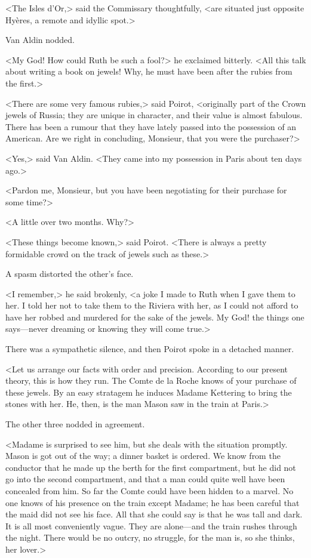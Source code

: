 <The Isles d'Or,> said the Commissary thoughtfully, <are situated just opposite Hyères, a remote and idyllic spot.>

Van Aldin nodded.

<My God! How could Ruth be such a fool?> he exclaimed bitterly. <All this talk about writing a book on jewels! Why, he must have been after the rubies from the first.>

<There are some very famous rubies,> said Poirot, <originally part of the Crown jewels of Russia; they are unique in character, and their value is almost fabulous. There has been a rumour that they have lately passed into the possession of an American. Are we right in concluding, Monsieur, that you were the purchaser?>

<Yes,> said Van Aldin. <They came into my possession in Paris about ten days ago.>

<Pardon me, Monsieur, but you have been negotiating for their purchase for some time?>

<A little over two months. Why?>

<These things become known,> said Poirot. <There is always a pretty formidable crowd on the track of jewels such as these.>

A spasm distorted the other's face.

<I remember,> he said brokenly, <a joke I made to Ruth when I gave them to her. I told her not to take them to the Riviera with her, as I could not afford to have her robbed and murdered for the sake of the jewels. My God! the things one says—never dreaming or knowing they will come true.>

There was a sympathetic silence, and then Poirot spoke in a detached manner.

<Let us arrange our facts with order and precision. According to our present theory, this is how they run. The Comte de la Roche knows of your purchase of these jewels. By an easy stratagem he induces Madame Kettering to bring the stones with her. He, then, is the man Mason saw in the train at Paris.>

The other three nodded in agreement.

<Madame is surprised to see him, but she deals with the situation promptly. Mason is got out of the way; a dinner basket is ordered. We know from the conductor that he made up the berth for the first compartment, but he did not go into the second compartment, and that a man could quite well have been concealed from him. So far the Comte could have been hidden to a marvel. No one knows of his presence on the train except Madame; he has been careful that the maid did not see his face. All that she could say is that he was tall and dark. It is all most conveniently vague. They are alone—and the train rushes through the night. There would be no outcry, no struggle, for the man is, so she thinks, her lover.>


